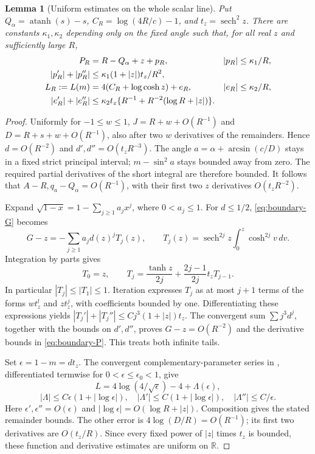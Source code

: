 \documentclass[11pt,a4paper]{article}
\newtheorem{lemma}[theorem]{Lemma}
\theoremstyle{remark}\newtheorem{remark}[theorem]{Remark}
\newcommand{\atanh}{\operatorname{atanh}}
\begin{document}
\begin{lemma}[Uniform estimates on the whole scalar line]\label{lem:boundary-uniform}
Put $Q_\alpha=\atanh(s)-s$, $C_R=\log(4R/c)-1$, and
$t_z=\operatorname{sech}^2z$. There are constants $\kappa_1,\kappa_2$
depending only on the fixed angle such that, for all real $z$
and sufficiently large $R$,
\begin{align}
 P_R&=R-Q_\alpha+z+p_R,&
 |p_R|&\le \kappa_1/R,\notag\\
 |p_R'|+|p_R''|&\le \kappa_1(1+|z|)t_z/R^2,\label{eq:boundary-P}\\
 L_R:=L(m)&=4(C_R+\log\cosh z)+e_R,&
 |e_R|&\le \kappa_2/R,\notag\\
 |e_R'|+|e_R''|&\le
 \kappa_2t_z\{R^{-1}+R^{-2}(\log R+|z|)\}.\label{eq:boundary-L}
\end{align}
\end{lemma}
\begin{proof}
Uniformly for $-1\le w\le1$,
$J=R+w+O(R^{-1})$ and $D=R+s+w+O(R^{-1})$, also after
two $w$ derivatives of the remainders. Hence $d=O(R^{-2})$ and
$d',d''=O(t_zR^{-3})$.
The angle $a=\alpha+\arcsin(c/D)$ stays in a fixed strict principal
interval; $m-\sin^2a$ stays bounded away from zero.
The required partial derivatives of the short integral are therefore
bounded. It follows that $A-R,q_a-Q_\alpha=O(R^{-1})$, with their
first two $z$ derivatives $O(t_zR^{-2})$.

Expand $\sqrt{1-x}=1-\sum_{j\ge1}a_jx^j$, where $0<a_j\le1$.
For $d\le1/2$, \eqref{eq:boundary-G} becomes
\[
 G-z=-\sum_{j\ge1}a_jd(z)^jT_j(z),\qquad
 T_j(z)=\operatorname{sech}^{2j}z\int_0^z\cosh^{2j}v\,dv.
\]
Integration by parts gives
\[
 T_0=z,\qquad T_j=\frac{\tanh z}{2j}
             +\frac{2j-1}{2j}t_zT_{j-1}.
\]
In particular $|T_j|\le|T_1|\le1$.
Iteration expresses $T_j$ as at most $j+1$ terms of the forms
$w t_z^l$ and $z t_z^j$, with coefficients bounded by one.
Differentiating these expressions yields
$|T_j'|+|T_j''|\le Cj^3(1+|z|)t_z$.
The convergent sum $\sum j^3d^j$, together with the bounds on
$d',d''$, proves $G-z=O(R^{-2})$ and the derivative bounds in
\eqref{eq:boundary-P}. This treats both infinite tails.

Set $\epsilon=1-m=d t_z$.
The convergent complementary-parameter series in
\cite[Section 19.12]{DLMF}, differentiated termwise for
$0<\epsilon\le\epsilon_0<1$, give
\[
 L=4\log(4/\sqrt\epsilon)-4+\Lambda(\epsilon),
\]
\[
 |\Lambda|\le C\epsilon(1+|\log\epsilon|),\quad
 |\Lambda'|\le C(1+|\log\epsilon|),\quad
 |\Lambda''|\le C/\epsilon.
\]
Here $\epsilon',\epsilon''=O(\epsilon)$ and
$|\log\epsilon|=O(\log R+|z|)$. Composition gives the stated
remainder bounds. The other error is $4\log(D/R)=O(R^{-1})$;
its first two derivatives are $O(t_z/R)$.
Since every fixed power of $|z|$ times $t_z$ is bounded,
these function and derivative estimates are uniform on $\mathbb R$.
\end{proof}
\end{document}
